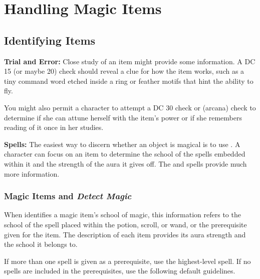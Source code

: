 \section{Handling Magic Items}

\subsection{Identifying Items}
\textbf{Trial and Error:} Close study of an item might provide some information. A DC 15 (or maybe 20)  check should reveal a clue for how the item works, such as a tiny command word etched inside a ring or feather motifs that hint the ability to fly.

You might also permit a character to attempt a DC 30  check or  (arcana) check to determine if she can attune herself with the item's power or if she remembers reading of it once in her studies.

\textbf{Spells:} The easiest way to discern whether an object is magical is to use . A character can focus on an item to determine the school of the spells embedded within it and the strength of the aura it gives off. The  and  spells provide much more information.

\subsubsection{Magic Items and \emph{Detect Magic}}
When  identifies a magic item's school of magic, this information refers to the school of the spell placed within the potion, scroll, or wand, or the prerequisite given for the item. The description of each item provides its aura strength and the school it belongs to.

If more than one spell is given as a prerequisite, use the highest-level spell. If no spells are included in the prerequisites, use the following default guidelines.






